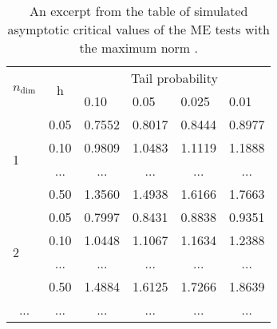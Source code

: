 \documentclass[main.tex]{subfiles}
\begin{document}
\begin{table}[]
\centering
\begin{tabular}{|l|l|l|l|l|l|}
\hline
\multirow{2}{*}{$n_{\text{dim}}$}        & \multicolumn{1}{c|}{\multirow{2}{*}{h}} & \multicolumn{4}{c|}{Tail probability}                                                                     \\ \cline{3-6} 
                          & \multicolumn{1}{c|}{}                   & 0.10                     & 0.05                     & 0.025                    & 0.01                     \\ \hline
\multirow{4}{*}{1}        & 0.05                                    & 0.7552                   & 0.8017                   & 0.8444                   & 0.8977                   \\ \cline{2-6} 
                          & 0.10                                    & 0.9809                   & 1.0483                   & 1.1119                   & 1.1888                   \\ \cline{2-6} 
                          & \multicolumn{1}{c|}{...}                & \multicolumn{1}{c|}{...} & \multicolumn{1}{c|}{...} & \multicolumn{1}{c|}{...} & \multicolumn{1}{c|}{...} \\ \cline{2-6} 
                          & 0.50                                    & 1.3560                   & 1.4938                   & 1.6166                   & 1.7663                   \\ \hline
\multirow{4}{*}{2}        & 0.05                                    & 0.7997                   & 0.8431                   & 0.8838                   & 0.9351                   \\ \cline{2-6} 
                          & 0.10                                    & 1.0448                   & 1.1067                   & 1.1634                   & 1.2388                   \\ \cline{2-6} 
                          & \multicolumn{1}{c|}{...}                & \multicolumn{1}{c|}{...} & \multicolumn{1}{c|}{...} & \multicolumn{1}{c|}{...} & \multicolumn{1}{c|}{...} \\ \cline{2-6} 
                          & 0.50                                    & 1.4884                   & 1.6125                   & 1.7266                   & 1.8639                   \\ \hline
\multicolumn{1}{|c|}{...} & \multicolumn{1}{c|}{...}                & \multicolumn{1}{c|}{...} & \multicolumn{1}{c|}{...} & \multicolumn{1}{c|}{...} & \multicolumn{1}{c|}{...} \\ \hline
\end{tabular}
\caption{An excerpt from the table of simulated asymptotic critical values of the
  ME tests with the maximum norm \cite{moving_estimate_test}.}
\label{table:critvals}
\end{table}
\end{document}
